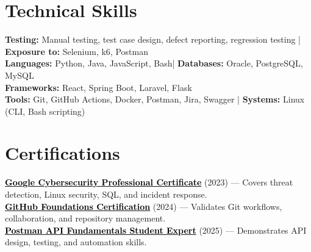 \documentclass[a4paper]{article}
\begin{document}
\section{Technical Skills}
\begin{itemize}[leftmargin=0.15in, label={}]
\small{\item{
\textbf{Testing:} Manual testing, test case design, defect reporting, regression testing \;|\; \textbf{Exposure to:} Selenium, k6, Postman\\
\textbf{Languages:} Python, Java, JavaScript, Bash\;|\;
\textbf{Databases:} Oracle, PostgreSQL, MySQL\\
\textbf{Frameworks:} React, Spring Boot, Laravel, Flask\\
\textbf{Tools:} Git, GitHub Actions, Docker, Postman, Jira, Swagger \;|\;
\textbf{Systems:} Linux (CLI, Bash scripting)
}}
\end{itemize}




\section{Certifications}
 \begin{itemize}[leftmargin=0.15in, label={}]
    \small{\item{
    \href{https://coursera.org/share/44fd8f381cb39ac45892569cdf6f7674}{\textcolor{black}{\textbf{Google Cybersecurity Professional Certificate}}} (2023) — Covers threat detection, Linux security, SQL, and incident response. \\
    \href{https://www.credly.com/badges/d5c30c19-02db-4c5f-9bc9-4bd0f4b6a89e/public_url}{\textcolor{black}{\textbf{GitHub Foundations Certification}}} (2024) — Validates Git workflows, collaboration, and repository management. \\
    \href{https://badges.parchment.com/public/assertions/ZF0yx-i3T1CvXYwDLEUneA?identity__email=sakib.sadman.badhon\%40g.bracu.ac.bd}{\textcolor{black}{\textbf{Postman API Fundamentals Student Expert}}} (2025) — Demonstrates API design, testing, and automation skills.
    }}
 \end{itemize}


\end{document}
